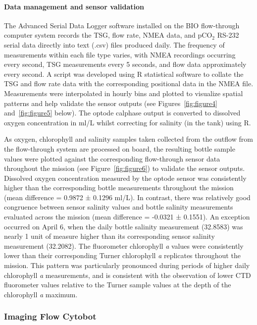 \documentclass[12pt]{article}\usepackage[]{graphicx}\usepackage[]{color}
\begin{document}
\pagestyle{plain}

\paragraph{Data management and sensor validation}\label{data-management-and-sensor-validation}

The Advanced Serial Data Logger software installed on the BIO flow-through computer system records the TSG, flow rate, NMEA data, and pCO\(_2\) RS-232 serial data directly into text (.csv) files produced daily. The frequency of measurements within each file type varies, with NMEA recordings occurring every second, TSG measurements every 5 seconds, and flow data approximately every second. A script was developed using R statistical software to collate the TSG and flow rate data with the corresponding positional data in the NMEA file. Measurements were interpolated in hourly bins and plotted to visualize spatial patterns and help validate the sensor outputs (see Figures~\ref{fig:figure4} and~\ref{fig:figure5} below). The optode calphase output is converted to dissolved oxygen concentration in ml/L whilst correcting for salinity (in the tank) using R.

As oxygen, chlorophyll and salinity samples taken collected from the outflow from the flow-through system are processed on board, the resulting bottle sample values were plotted against the corresponding flow-through sensor data throughout the mission (see Figure~\ref{fig:figure6}) to validate the sensor outputs. Dissolved oxygen concentration measured by the optode sensor was consistently higher than the corresponding bottle measurements throughout the mission (mean difference = 0.9872 ± 0.1296 ml/L). In contrast, there was relatively good congruence between sensor salinity values and bottle salinity measurements evaluated across the mission (mean difference = -0.0321 ± 0.1551). An exception occurred on April 6, when the daily bottle salinity measurement (32.8583) was nearly 1 unit of measure higher than its corresponding sensor salinity measurement (32.2082). The fluorometer chlorophyll \emph{a} values were consistently lower than their corresponding Turner chlorophyll \emph{a} replicates throughout the mission. This pattern was particularly pronounced during periods of higher daily chlorophyll \emph{a} measurements, and is consistent with the observation of lower CTD fluorometer values relative to the Turner sample values at the depth of the chlorophyll \emph{a} maximum.

\subsubsection{Imaging Flow Cytobot}\label{imaging-flow-cytobot}
\end{document}
